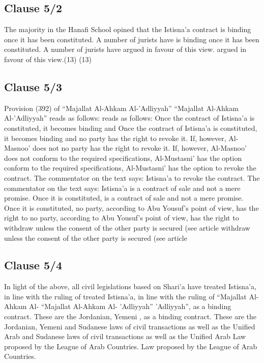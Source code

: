 \documentclass{article}%
\begin{document}
%
\subsection{Clause 5/2}%
\label{subsec:Clause5/2}%
The majority in the Hanafi School opined that the Istisna’a contract  is binding once it has been constituted. A number of jurists have  is binding once it has been constituted. A number of jurists have  argued in favour of this view. argued in favour of this view.(13) (13)

%
\subsection{Clause 5/3}%
\label{subsec:Clause5/3}%
Provision (392) of “Majallat Al-Ahkam Al-’Adliyyah” “Majallat Al-Ahkam Al-’Adliyyah” reads as follows:  reads as follows:   Once the contract of Istisna’a is constituted, it becomes binding and    Once the contract of Istisna’a is constituted, it becomes binding and  no party has the right to revoke it. If, however, Al-Masnoo’ does not  no party has the right to revoke it. If, however, Al-Masnoo’ does not  conform to the required specifications, Al-Mustasni’ has the option  conform to the required specifications, Al-Mustasni’ has the option  to revoke the contract. The commentator on the text says: Istisna’a  to revoke the contract. The commentator on the text says: Istisna’a  is a contract of sale and not a mere promise. Once it is constituted,  is a contract of sale and not a mere promise. Once it is constituted,  no party, according to Abu Yousuf’s point of view, has the right to  no party, according to Abu Yousuf’s point of view, has the right to  withdraw unless the consent of the other party is secured (see article  withdraw unless the consent of the other party is secured (see article

%
\subsection{Clause 5/4}%
\label{subsec:Clause5/4}%
In light of the above, all civil legislations based on Shari’a have  treated Istisna’a, in line with the ruling of  treated Istisna’a, in line with the ruling of “Majallat Al-Ahkam Al- “Majallat Al-Ahkam Al- ’Adliyyah” ’Adliyyah”, as a binding contract. These are the Jordanian, Yemeni  , as a binding contract. These are the Jordanian, Yemeni  and Sudanese laws of civil transactions as well as the Unified Arab  and Sudanese laws of civil transactions as well as the Unified Arab  Law proposed by the League of Arab Countries. Law proposed by the League of Arab Countries.
\end{document}
